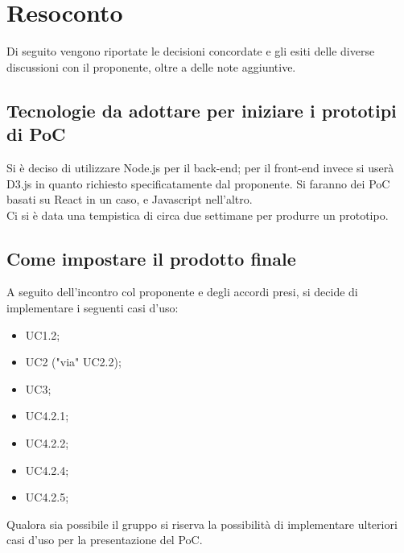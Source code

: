 \documentclass{article}
\begin{document}
\section{Resoconto}
\label{sec:resoconto}

Di seguito vengono riportate le decisioni concordate e gli esiti delle diverse discussioni con il proponente, oltre a 
delle note aggiuntive.

\subsection{Tecnologie da adottare per iniziare i prototipi di PoC}
\label{itm:1}

Si è deciso di utilizzare Node.js per il back-end; per il front-end invece si userà D3.js in quanto richiesto specificatamente dal proponente. Si faranno dei PoC basati su React in un caso, e Javascript nell’altro. \\
Ci si è data una tempistica di circa due settimane per produrre un prototipo.


\subsection{Come impostare il prodotto finale}
\label{itm:2}

A seguito dell’incontro col proponente e degli accordi presi, si decide di implementare i seguenti casi d’uso:

\begin{itemize}
	\item UC1.2;
	\item UC2 ("via" UC2.2);
	\item UC3;
	\item UC4.2.1;
	\item UC4.2.2;
	\item UC4.2.4;
	\item UC4.2.5;
\end{itemize}
Qualora sia possibile il gruppo si riserva la possibilità di implementare ulteriori casi d’uso per la presentazione del PoC.
\end{document}
